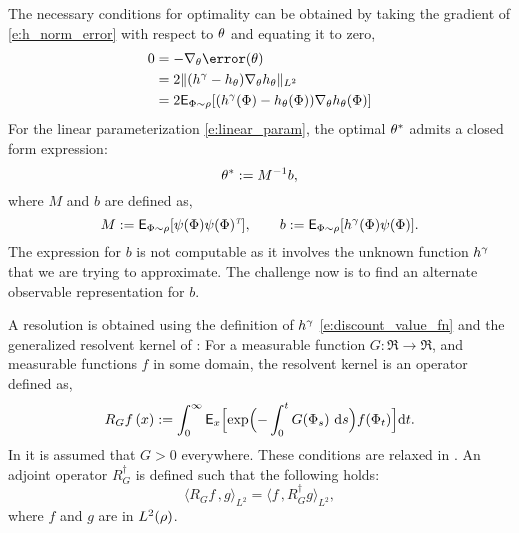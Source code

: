 The necessary conditions for optimality can be obtained by taking the gradient of \eqref{e:h_norm_error} with respect to $\theta$ and equating it to zero, 
\begin{equation}
\begin{aligned}
0 &= - \nabla_\param \error(\param)\\
& = 2 \|(h^\discount - h_\param) \nabla_\param h_\param \|_{L^2} \\
& = 2 \Expect_{\markovstate \sim \pr} [(h^\discount(\markovstate) - h_\param(\markovstate)) \nabla_\param h_\param(\markovstate)]
\end{aligned}
\end{equation} 
For the linear parameterization \eqref{e:linear_param}, the optimal $\theta^*$ admits a closed form expression:
\begin{equation}
\param^* := M^{-1} b,
\label{e:param_opt_lstd}
\end{equation}
where $M$ and $b$ are defined as,
\begin{equation}
M: = \Expect_{\markovstate \sim \pr} [\basis(\markovstate) \basis(\markovstate)^\transpose], \qquad b:= \Expect_{\markovstate \sim \pr} [h^\discount(\markovstate) \basis(\markovstate)].
\label{e:lstd_M_b}
\end{equation}
The expression for $b$ is not computable as it involves the unknown function $h^\gamma$ that we are trying to approximate. The challenge now is to find an alternate observable representation for $b$. 

A resolution is obtained using the definition of $h^\gamma$ \eqref{e:discount_value_fn} and the generalized resolvent kernel of \cite{nev72,meytwe93e,devkonmey17a}: For a measurable function $G\colon\Re\to\Re$, and measurable functions $f$ in some domain, the resolvent kernel is an operator defined as,
\begin{equation}
R_G f\, (x) := \int_0^\infty \Expect_x\Bigl[ \exp\Bigl(-\int_0^t G(\markovstate_s)\, \rmd s \Bigr) f(\markovstate_t)\Bigr] \ud t.
\label{e:resolvent_neveu}
\end{equation}
In  \cite{nev72,meytwe93e} it is assumed that $G>0$ everywhere. These conditions are relaxed in \cite{konmey03a,devkonmey17a}. An adjoint operator $R^\dagger_G$ is defined such that the following holds:
\begin{equation}
\langle R_G f \, , g \rangle_{L^2} = \langle f \, , R^\dagger_G g \rangle_{L^2}, 
\label{e:RG_adjoint}
\end{equation}
where $f$ and $g$ are in $L^2(\rho)$. 

